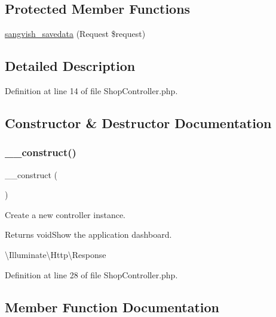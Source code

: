 \subsection*{Protected Member Functions}
\begin{DoxyCompactItemize}
\item 
\mbox{\hyperlink{class_responsive_1_1_http_1_1_controllers_1_1_shop_controller_a63d8d498a130e9f530dd9de0247a0c74}{sangvish\+\_\+savedata}} (Request \$request)
\end{DoxyCompactItemize}


\subsection{Detailed Description}


Definition at line 14 of file Shop\+Controller.\+php.



\subsection{Constructor \& Destructor Documentation}
\mbox{\label{class_responsive_1_1_http_1_1_controllers_1_1_shop_controller_a095c5d389db211932136b53f25f39685}} 
\subsubsection{\texorpdfstring{\_\_construct()}{\_\_construct()}}
{\footnotesize\ttfamily \+\_\+\+\_\+construct (\begin{DoxyParamCaption}{ }\end{DoxyParamCaption})}

Create a new controller instance.

\begin{DoxyReturn}{Returns}
void\+Show the application dashboard.

\textbackslash{}\+Illuminate\textbackslash{}\+Http\textbackslash{}\+Response 
\end{DoxyReturn}


Definition at line 28 of file Shop\+Controller.\+php.



\subsection{Member Function Documentation}
\mbox{\label{class_responsive_1_1_http_1_1_controllers_1_1_shop_controller_af6941ecb27762273fef0e0a507c0e5f8}} 
